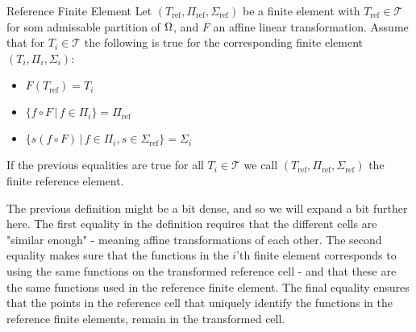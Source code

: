 \iffalse \begin{defn}{Affine Family}
    A family of finite element spaces $S_h$ for partitions $\mathcal{T}_h$ of 
    $\OO\subset \RR^d$ is called an affine family if there exists a finite reference
    element $(T_{\text{ref}}, \Pi_{\text{ref}},\Sigma)$, such that, beside the 
    usual properties of a finite element, there exists some affine mappings 
    $F_j:T_{\text{ref}}\to T_j$ such that
    \begin{equation*}
        \forall v \in S_h \,\,\land \,\, \forall x \in T_j:\,\, v(x) = p(F^{-1}_j(x)) \quad 
        p \in \Pi_{\text{ref}}.
    \end{equation*}
    Meaning, when restricting $v\in S_h$ to some $T_j$, we can fully describe 
    $v$ using some affine mapping and an element in $\Pi_{\text{ref}}$.
\end{defn}
\fi
\begin{defn}{Reference Finite Element} 
    Let $(T_{\text{ref}}, \Pi_{\text{ref}},\Sigma_{\text{ref}})$ be a finite element 
    with $T_{\text{ref}}\in \mathcal{T}$ for som admissable partition of 
    $\Omega$, and 
    $F$ an affine linear transformation. 
    Assume that for $T_i\in\mathcal{T}$ the following 
    is true for the corresponding finite element $(T_i, \Pi_i,\Sigma_i)$:
    \begin{itemize}
        \item $F(T_{\text{ref}}) = T_i$
        \item $\{ f\circ F \,|\,  f \in \Pi_i \} =\Pi_{\text{ref}}  $
        \item $\{ s(f\circ F) \,|\, f \in \Pi_i, s \in \Sigma_{\text{ref}} \} = \Sigma_i$
    \end{itemize}
    If the previous equalities are true for all $T_i\in \mathcal{T}$ we call 
    $(T_{\text{ref}}, \Pi_{\text{ref}},\Sigma_{\text{ref}})$ the finite reference 
    element.
\end{defn}
The previous definition might be a bit dense, and so we will expand a bit 
further here. The first equality in the definition requires that the 
different cells are "similar enough" - meaning affine transformations of 
each other. The second equality makes sure 
that the functions in the $i$'th finite element corresponds 
to using the same  
functions on the transformed reference cell - and that these are the 
same functions used in the reference finite element.
The final equality ensures that the points in the reference cell that 
uniquely identify the functions in the reference finite elements, 
remain in the transformed cell.